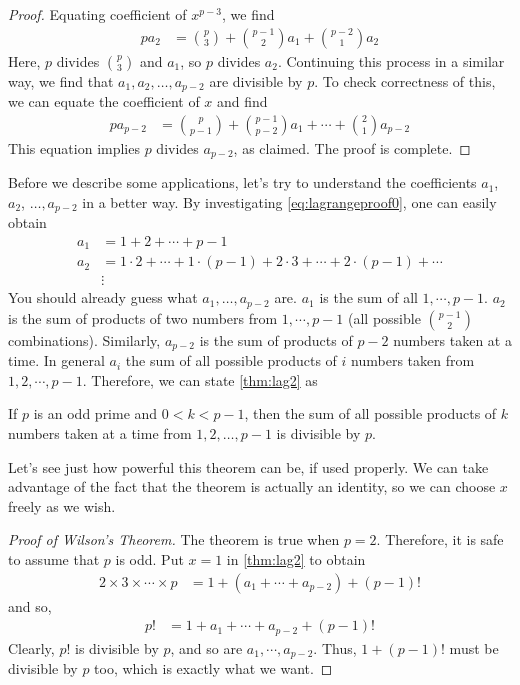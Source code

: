 \begin{proof}[Proof]
		Equating coefficient of $x^{p-3}$, we find
			\begin{align*}
				pa_2
					& = \binom{p}{3}+\binom{p-1}{2}a_1+\binom{p-2}{1}a_2
			\end{align*}
		Here, $p$ divides $\binom{p}{3}$ and $a_1$, so $p$ divides $a_2$. Continuing this process in a similar way, we find that $a_1, a_2, \ldots, a_{p-2}$ are divisible by $p$. To check correctness of this, we can equate the coefficient of $x$ and find
			\begin{align*}
				pa_{p-2}
					& = \binom{p}{p-1}+\binom{p-1}{p-2}a_1+\cdots+\binom{2}{1}a_{p-2}
			\end{align*}
		This equation implies $p$ divides $a_{p-2}$, as claimed. The proof is complete.
	\end{proof}
Before we describe some applications, let's try to understand the coefficients $a_1$, $a_2$, $\ldots,a_{p-2}$ in a better way. By investigating \eqref{eq:lagrangeproof0}, one can easily obtain
	\begin{align*}
		a_1 & = 1+2+\cdots+p-1\\
		a_2 & = 1\cdot2+\cdots+1\cdot(p-1)+2\cdot3+\cdots+2\cdot(p-1)+\cdots\\
			&  \vdots
	\end{align*}
You should already guess what $a_1,\ldots,a_{p-2}$ are. $a_1$ is the sum of all $1,\cdots,p-1$. $a_2$ is the sum of products of two numbers from $1,\cdots,p-1$ (all possible $\binom{p-1}{2}$ combinations). Similarly, $a_{p-2}$ is the sum of products of $p-2$ numbers taken at a time. In general $a_i$ the sum of all possible products of $i$ numbers taken from $1,2,\cdots,p-1$. Therefore, we can state \autoref{thm:lag2} as
	\begin{theorem}
		If $p$ is an odd prime and $0<k<p-1$, then the sum of all possible products of $k$ numbers taken at a time from $1,2,\ldots,p-1$ is divisible by $p$.
	\end{theorem}
Let's see just how powerful this theorem can be, if used properly. We can take advantage of the fact that the theorem is actually an identity, so we can choose $x$ freely as we wish.
	\begin{proof}[Proof of Wilson's Theorem]
		The theorem is true when $p=2$. Therefore, it is safe to assume that $p$ is odd. Put $x=1$ in \autoref{thm:lag2} to obtain
			\begin{align*}
				2\times 3 \times \cdots \times p & = 1+(a_1+\cdots+a_{p-2})+(p-1)!
			\end{align*}
		and so,
			\begin{align*}
				p! & = 1+a_1+\cdots+a_{p-2}+(p-1)!
			\end{align*}
		Clearly, $p!$ is divisible by $p$, and so are $a_1,\cdots,a_{p-2}$. Thus, $1+(p-1)!$ must be divisible by $p$ too, which is exactly what we want.
	\end{proof}
